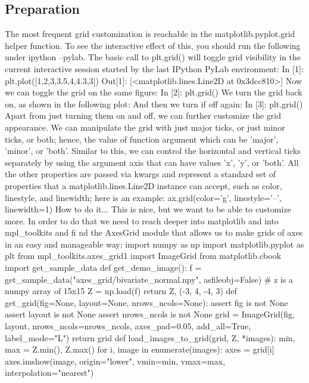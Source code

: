 \subsection{Preparation}
The most frequent grid customization is reachable in the matplotlib.pyplot.grid
helper function.
To see the interactive effect of this, you should run the following under ipython –pylab.
The basic call to plt.grid() will toggle grid visibility in the current interactive session
started by the last IPython PyLab environment:
In [1]: plt.plot([1,2,3,3.5,4,4.3,3])
Out[1]: [<matplotlib.lines.Line2D at 0x3dcc810>]
Now we can toggle the grid on the same figure:
In [2]: plt.grid()
We turn the grid back on, as shown in the following plot:
And then we turn if off again:
In [3]: plt.grid()
Apart from just turning them on and off, we can further customize the grid appearance.
We can manipulate the grid with just major ticks, or just minor ticks, or both; hence, the value
of function argument which can be 'major', 'minor', or 'both'. Similar to this, we can
control the horizontal and vertical ticks separately by using the argument axis that can have
values 'x', 'y', or 'both'.
All the other properties are passed via kwargs and represent a standard set of properties
that a matplotlib.lines.Line2D instance can accept, such as color, linestyle,
and linewidth; here is an example:
ax.grid(color='g', linestyle='--', linewidth=1)
How to do it...
This is nice, but we want to be able to customize more. In order to do that we need to reach
deeper into matplotlib and into mpl_toolkits and fi nd the AxesGrid module that allows
us to make grids of axes in an easy and manageable way:
import numpy as np
import matplotlib.pyplot as plt
from mpl_toolkits.axes_grid1 import ImageGrid
from matplotlib.cbook import get_sample_data
def get_demo_image():
 f = get_sample_data("axes_grid/bivariate_normal.npy",
asfileobj=False)
 # z is a numpy array of 15x15
 Z = np.load(f)
 return Z, (-3, 4, -4, 3)
def get_grid(fig=None, layout=None, nrows_ncols=None):
 assert fig is not None
 assert layout is not None
 assert nrows_ncols is not None
 grid = ImageGrid(fig, layout, nrows_ncols=nrows_ncols,
 axes_pad=0.05, add_all=True, label_mode="L")
 return grid
def load_images_to_grid(grid, Z, *images):
 min, max = Z.min(), Z.max()
 for i, image in enumerate(images):
 axes = grid[i]
 axes.imshow(image, origin="lower", vmin=min, vmax=max,
 interpolation="nearest")
